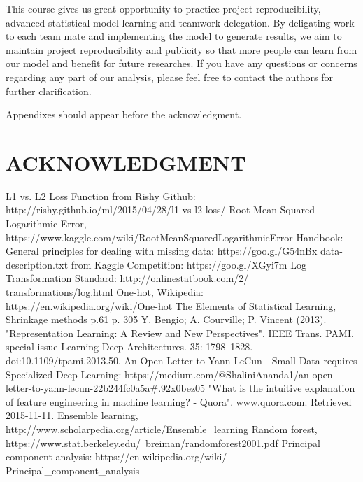 \documentclass[letterpaper, 10 pt, conference]{ieeeconf}\usepackage[]{graphicx}\usepackage[]{color}
\begin{document}
This course gives us great opportunity to practice project reproducibility, advanced statistical model learning and teamwork delegation. By deligating work to each team mate and implementing the model to generate results, we aim to maintain project reproducibility and publicity so that more people can learn from our model and benefit for future researches. If you have any questions or concerns regarding any part of our analysis, please feel free to contact the authors for further clarification.

\addtolength{\textheight}{-12cm} 


Appendixes should appear before the acknowledgment.

\section*{ACKNOWLEDGMENT}

\begin{thebibliography}{99}

 L1 vs. L2 Loss Function from Rishy Github: http://rishy.github.io/ml/2015/04/28/l1-vs-l2-loss/
 Root Mean Squared Logarithmic Error, https://www.kaggle.com/wiki/RootMeanSquaredLogarithmicError
 Handbook: General principles for dealing with missing data: https://goo.gl/G54nBx
 data-description.txt from Kaggle Competition: https://goo.gl/XGyi7m
 Log Transformation Standard: http://onlinestatbook.com/2/\newline
transformations/log.html
 One-hot, Wikipedia: https://en.wikipedia.org/wiki/One-hot
 The Elements of Statistical Learning, Shrinkage methods p.61  p. 305 
 Y. Bengio; A. Courville; P. Vincent (2013). "Representation Learning: A Review and New Perspectives". IEEE Trans. PAMI, special issue Learning Deep Architectures. 35: 1798–1828. doi:10.1109/tpami.2013.50.
 An Open Letter to Yann LeCun - Small Data requires Specialized Deep Learning: https://medium.com/@ShaliniAnanda1/an-open-letter-to-yann-lecun-22b244fc0a5a\#.92x0bez05
 "What is the intuitive explanation of feature engineering in machine learning? - Quora". www.quora.com. Retrieved 2015-11-11.
 Ensemble learning, http://www.scholarpedia.org/article/Ensemble\_learning
 Random forest, https://www.stat.berkeley.edu/~breiman/randomforest2001.pdf
 Principal component analysis: https://en.wikipedia.org/wiki/ \newline
Principal\_component\_analysis

\end{thebibliography}
\end{document}
